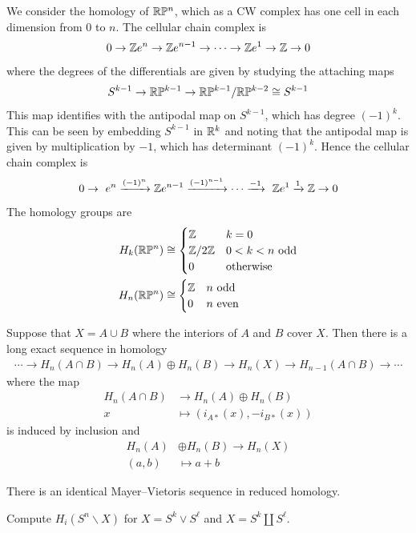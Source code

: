 \documentclass[12pt]{article}
\begin{document}
\begin{example}
    We consider the homology of $\mathbb{R}\mathbb{P}^n$, which as a CW complex has one cell in each dimension from $0$ to $n$. The cellular chain complex is
    \[0 \to \mathbb{Z} e^n \to \mathbb{Z} e^{n-1} \to \cdots \to \mathbb{Z} e^1 \to \mathbb{Z} \to 0\]
    where the degrees of the differentials are given by studying the attaching maps \[S^{k-1}\to \mathbb{R}\mathbb{P}^{k-1} \to \mathbb{R}\mathbb{P}^{k-1}/\mathbb{R}\mathbb{P}^{k-2}\cong S^{k-1}\] This map identifies with the antipodal map on $S^{k-1}$, which has degree $(-1)^k$. This can be seen by embedding $S^{k-1}$ in $\mathbb{R}^k$ and noting that the antipodal map is given by multiplication by $-1$, which has determinant $(-1)^k$. Hence the cellular chain complex is
    \[0 \to \ e^n \xrightarrow{(-1)^n} \Z e^{n-1} \xrightarrow{(-1)^{n-1}} \cdots \xrightarrow{-1} \ \Z e^1 \xrightarrow{1} \Z \to 0\]
    The homology groups are
    \begin{align*}
        H_k(\mathbb{R}\mathbb{P}^n) & \cong \begin{cases}
                                \mathbb{Z}     & k=0                 \\
                                \mathbb{Z}/2\mathbb{Z} & 0<k<n \text{ odd} \\
                                0      & \text{otherwise}
                            \end{cases} \\
        H_n(\mathbb{R}\mathbb{P}^n) & \cong \begin{cases}
                                \mathbb{Z} & n \text{ odd}  \\
                                0  & n \text{ even}
                            \end{cases}
    \end{align*}
\end{example}


\begin{theorem}
    Suppose that $X = A \cup B$ where the interiors of $A$ and $B$ cover $X$. Then there is a long exact sequence in homology \begin{align*}
        \cdots \to H_n(A\cap B) \to H_n(A)\oplus H_n(B) \to H_n(X) \to H_{n-1}(A\cap B) \to \cdots
    \end{align*} where the map \begin{align*}
        H_n(A\cap B) & \to H_n(A)\oplus H_n(B)        \\
        x            & \mapsto (i_{A*}(x),-i_{B*}(x))
    \end{align*} is induced by inclusion and \begin{align*}
        H_n(A) & \oplus H_n(B)\to H_n(X) \\
        (a,b)  & \mapsto a+b
    \end{align*}
\end{theorem}
There is an identical Mayer--Vietoris sequence in reduced homology.
\begin{exercise}
    Compute $H_i(S^n \backslash X)$ for $X= S^k \vee S^\ell$ and $X = S^k \coprod S^\ell$.
\end{exercise}
\end{document}
